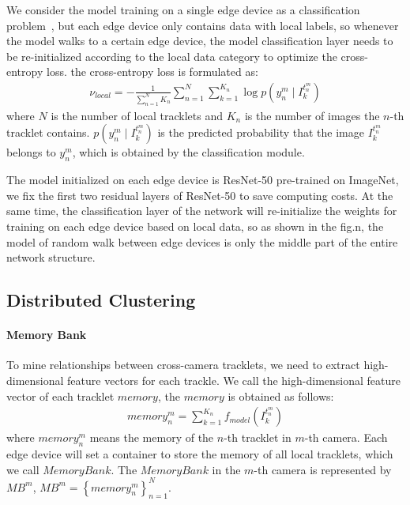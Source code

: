 \documentclass{article}
\begin{document}
We consider the model training on a single edge device as a classification problem~\cite{zheng2016person}, but each edge device only contains data with local labels, so whenever the model walks to a certain edge device, the model classification layer needs to be re-initialized according to the local data category to optimize the cross-entropy loss. the cross-entropy loss is formulated as:
\begin{equation}
\begin{aligned}
    \nu _{local}=-\frac{1}{\sum_{n=1}^{N} K_{n}}\sum_{n=1}^{N}\sum_{k=1}^{K_{n}}\log p(y_{n}^{m}\mid I_{k}^{t_{n}^{m}})
\end{aligned}
\end{equation}
where $N$ is the number of local tracklets and $K_{n}$ is the number of images the $n$-th tracklet contains. $p(y_{n}^{m}\mid I_{k}^{t_{n}^{m}})$ is the predicted probability that the image $I_{k}^{t_{n}^{m}}$ belongs to $y_{n}^{m}$, which is obtained by the classification module.


The model initialized on each edge device is ResNet-50 pre-trained on ImageNet, we fix the first two residual layers of ResNet-50 to save computing costs. At the same time, the classification layer of the network will re-initialize the weights for training on each edge device based on local data, so as shown in the fig.n, the model of random walk between edge devices is only the middle part of the entire network structure.

\subsection{Distributed Clustering}
\paragraph{Memory Bank}To mine relationships between cross-camera tracklets, we need to extract high-dimensional feature vectors for each trackle. We call the high-dimensional feature vector of each tracklet $memory$, the $memory$ is obtained as follows:
\begin{equation}
\begin{aligned}
memory_{n}^{m} = \sum_{k=1}^{K_{n}}f_{model}(I_{k}^{t_{n}^{m}})
\end{aligned}
\end{equation}
where $memory_{n}^{m}$ means the memory of the $n$-th tracklet in $m$-th camera. Each edge device will set a container to store the memory of all local tracklets, which we call $Memory Bank$. The $Memory Bank$ in the $m$-th camera is represented by $MB^{m}$, $MB^{m} = \left \{ memory_{n}^{m} \right \}_{n=1}^{N}$.
\end{document}
